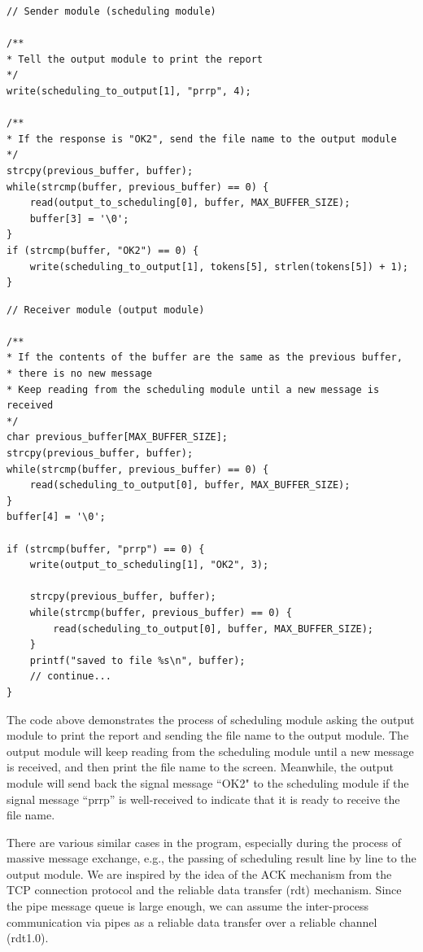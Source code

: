 \documentclass[a4paper, 12pt]{article}
\begin{document}
\begin{lstlisting}
// Sender module (scheduling module)

/**
* Tell the output module to print the report
*/
write(scheduling_to_output[1], "prrp", 4);

/**
* If the response is "OK2", send the file name to the output module
*/
strcpy(previous_buffer, buffer);
while(strcmp(buffer, previous_buffer) == 0) {
    read(output_to_scheduling[0], buffer, MAX_BUFFER_SIZE);
    buffer[3] = '\0';
}
if (strcmp(buffer, "OK2") == 0) {
    write(scheduling_to_output[1], tokens[5], strlen(tokens[5]) + 1);
}
\end{lstlisting}

\begin{lstlisting}
// Receiver module (output module)

/**
* If the contents of the buffer are the same as the previous buffer, 
* there is no new message
* Keep reading from the scheduling module until a new message is received
*/
char previous_buffer[MAX_BUFFER_SIZE];
strcpy(previous_buffer, buffer);
while(strcmp(buffer, previous_buffer) == 0) {
    read(scheduling_to_output[0], buffer, MAX_BUFFER_SIZE);
}
buffer[4] = '\0';

if (strcmp(buffer, "prrp") == 0) {
    write(output_to_scheduling[1], "OK2", 3);
    
    strcpy(previous_buffer, buffer);
    while(strcmp(buffer, previous_buffer) == 0) {
        read(scheduling_to_output[0], buffer, MAX_BUFFER_SIZE);
    }
    printf("saved to file %s\n", buffer);
    // continue...
}
\end{lstlisting}

The code above demonstrates the process of scheduling module asking the output module to print the report and sending the file name to the output module.
The output module will keep reading from the scheduling module until a new message is received, and then print the file name to the screen.
Meanwhile, the output module will send back the signal message ``OK2" to the scheduling module 
if the signal message ``prrp'' is well-received to indicate that it is ready to receive the file name.

There are various similar cases in the program, especially during the process of massive message exchange, e.g.,
the passing of scheduling result line by line to the output module.
We are inspired by the idea of the ACK mechanism from the TCP connection protocol and the reliable data transfer (rdt) mechanism.
Since the pipe message queue is large enough, we can assume the inter-process communication via pipes as a reliable data transfer over a reliable channel (rdt1.0).
\end{document}
